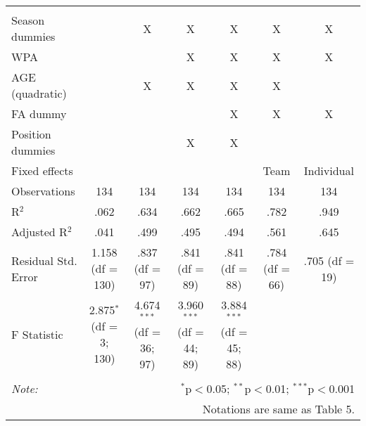 \begin{table}[H]
\begin{tabular}{@{\extracolsep{5pt}}lcccccc}
  & & & & & & \\
\hline \\[-1.8ex]
Season dummies &  & X & X & X & X & X \\
WPA & & & X & X & X & X \\
AGE (quadratic) &  & X & X & X & X &  \\
FA dummy &  &  &  & X & X & X \\
Position dummies &  &  & X & X &  &  \\
Fixed effects &  &  &  &  & Team & Individual \\
Observations & 134 & 134 & 134 & 134 & 134 & 134 \\
R$^{2}$ & .062 & .634 & .662 & .665 & .782 & .949 \\
Adjusted R$^{2}$ & .041 & .499 & .495 & .494 & .561 & .645 \\
Residual Std. Error & 1.158 (df = 130) & .837 (df = 97) & .841 (df = 89) & .841 (df = 88) & .784 (df = 66) & .705 (df = 19) \\
F Statistic & 2.875$^{*}$ (df = 3; 130) & 4.674$^{***}$ (df = 36; 97) & 3.960$^{***}$ (df = 44; 89) & 3.884$^{***}$ (df = 45; 88) &  &  \\
\hline
\hline \\[-1.8ex]
\textit{Note:}  & \multicolumn{6}{r}{$^{*}$p$<$0.05; $^{**}$p$<$0.01; $^{***}$p$<$0.001} \\
& \multicolumn{6}{r}{Notations are same as Table 5.} \\
\end{tabular}
\end{table}
